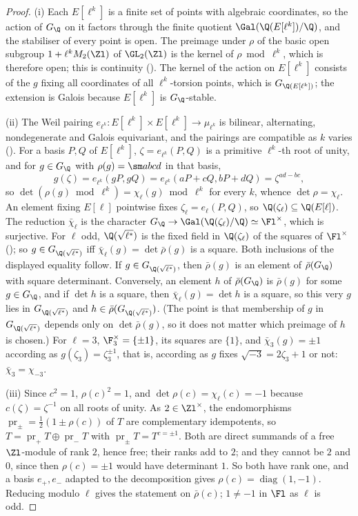 \begin{proof}
(i) Each $E[\ell^k]$ is a finite set of points with algebraic coordinates, so the action of $G_\Q$ on it factors through the finite quotient
$\Gal(\Q(E[\ell^k])/\Q)$, and the stabiliser of every point is open. The preimage under $\rho$ of the basic open subgroup $1+\ell^kM_2(\Zl)$ of $\GL_2(\Zl)$ is the kernel of $\rho\bmod\ell^k$, which is
therefore open; this is continuity (). The kernel of the action on
$E[\ell^k]$ consists of the $g$ fixing all coordinates of all $\ell^k$-torsion points, which is $G_{\Q(E[\ell^k])}$; the extension is Galois because
$E[\ell^k]$ is $G_\Q$-stable.

(ii) The Weil pairing $e_{\ell^k}\colon E[\ell^k]\times E[\ell^k]\to\mu_{\ell^k}$ is bilinear, alternating, nondegenerate and Galois equivariant, and the
pairings are compatible as $k$ varies (). For a basis $P,Q$ of $E[\ell^k]$, $\zeta=e_{\ell^k}(P,Q)$ is a primitive $\ell^k$-th root
of unity, and for $g\in G_\Q$ with $\rho(g)=\sm abcd$ in that basis,
\[
g(\zeta)=e_{\ell^k}(gP,gQ)=e_{\ell^k}(aP+cQ,bP+dQ)=\zeta^{ad-bc},
\]
so $\det(\rho(g)\bmod\ell^k)=\chi_\ell(g)\bmod\ell^k$ for every $k$, whence $\det\rho=\chi_\ell$. An element fixing $E[\ell]$ pointwise fixes $\zeta_\ell=e_\ell(P,Q)$,
so $\Q(\zeta_\ell)\subseteq\Q(E[\ell])$. The reduction $\bar\chi_\ell$ is the character $G_\Q\to\Gal(\Q(\zeta_\ell)/\Q)\simeq\Fl^\times$, which is surjective. For $\ell$
odd, $\Q(\sqrt{\ell^*})$ is the fixed field in $\Q(\zeta_\ell)$ of the squares of $\Fl^\times$ (); so $g\in G_{\Q(\sqrt{\ell^*})}$ iff
$\bar\chi_\ell(g)=\det\bar\rho(g)$ is a square. Both inclusions of the displayed equality follow. If $g\in G_{\Q(\sqrt{\ell^*})}$, then $\bar\rho(g)$ is an
element of $\bar\rho(G_\Q)$ with square determinant. Conversely, an element $h$ of $\bar\rho(G_\Q)$ is $\bar\rho(g)$ for some $g\in G_\Q$, and if $\det h$
is a square, then $\bar\chi_\ell(g)=\det h$ is a square, so this very $g$ lies in $G_{\Q(\sqrt{\ell^*})}$ and $h\in\bar\rho(G_{\Q(\sqrt{\ell^*})})$. (The point is that
membership of $g$ in $G_{\Q(\sqrt{\ell^*})}$ depends only on $\det\bar\rho(g)$, so it does not matter which preimage of $h$ is chosen.) For $\ell=3$, $\F_3^\times=\{\pm1\}$, its squares are $\{1\}$, and $\bar\chi_3(g)=\pm1$ according as $g(\zeta_3)=\zeta_3^{\pm1}$, that is,
according as $g$ fixes $\sqrt{-3}=2\zeta_3+1$ or not: $\bar\chi_3=\chi_{-3}$.

(iii) Since $c^2=1$, $\rho(c)^2=1$, and $\det\rho(c)=\chi_\ell(c)=-1$ because $c(\zeta)=\zeta^{-1}$ on all roots of unity. As $2\in\Zl^\times$, the
endomorphisms $\operatorname{pr}_\pm=\frac12(1\pm\rho(c))$ of $T$ are complementary idempotents, so $T=\operatorname{pr}_+T\oplus\operatorname{pr}_-T$ with $\operatorname{pr}_\pm T=T^{c=\pm1}$. Both are direct
summands of a free $\Zl$-module of rank $2$, hence free; their ranks add to $2$; and they cannot be $2$ and $0$, since then $\rho(c)=\pm1$ would
have determinant $1$. So both have rank one, and a basis $e_+,e_-$ adapted to the decomposition gives $\rho(c)=\operatorname{diag}(1,-1)$. Reducing
modulo $\ell$ gives the statement on $\bar\rho(c)$; $1\ne-1$ in $\Fl$ as $\ell$ is odd.


\end{proof}
